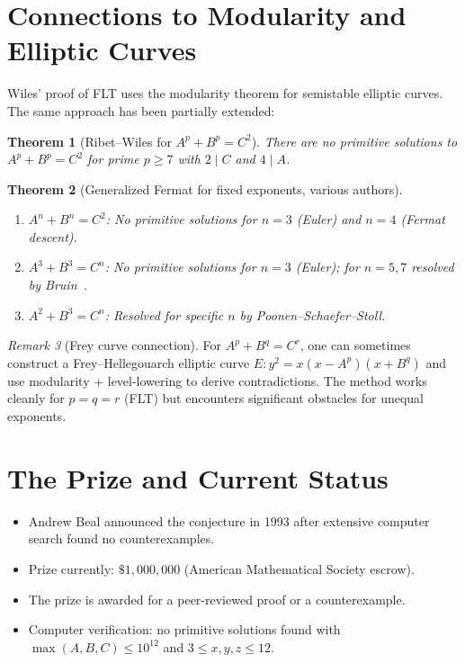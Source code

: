 \documentclass[12pt,a4paper]{amsart}
\newtheorem{theorem}{Theorem}[section]
\theoremstyle{definition}
\theoremstyle{remark}
\newtheorem{remark}[theorem]{Remark}
\begin{document}
\section{Connections to Modularity and Elliptic Curves}

Wiles' proof of FLT uses the modularity theorem for semistable elliptic curves.
The same approach has been partially extended:

\begin{theorem}[Ribet--Wiles for $A^p + B^p = C^2$]\label{thm:rpw}
There are no primitive solutions to $A^p + B^p = C^2$ for prime $p \geq 7$
with $2 \mid C$ and $4 \mid A$.
\end{theorem}

\begin{theorem}[Generalized Fermat for fixed exponents, various authors]\label{thm:genFerm}
\begin{enumerate}[label=(\roman*)]
  \item $A^n + B^n = C^2$: No primitive solutions for $n = 3$ (Euler) and
        $n = 4$ (Fermat descent).
  \item $A^3 + B^3 = C^n$: No primitive solutions for $n = 3$ (Euler); for
        $n = 5, 7$ resolved by Bruin~\cite{Bruin03}.
  \item $A^2 + B^3 = C^n$: Resolved for specific $n$ by Poonen--Schaefer--Stoll.
\end{enumerate}
\end{theorem}

\begin{remark}[Frey curve connection]
For $A^p + B^q = C^r$, one can sometimes construct a Frey--Hellegouarch elliptic
curve $E: y^2 = x(x - A^p)(x + B^q)$ and use modularity + level-lowering to derive
contradictions. The method works cleanly for $p = q = r$ (FLT) but encounters
significant obstacles for unequal exponents.
\end{remark}

\section{The Prize and Current Status}

\begin{itemize}
  \item Andrew Beal announced the conjecture in 1993 after extensive computer
        search found no counterexamples.
  \item Prize currently: $\$1{,}000{,}000$ (American Mathematical Society escrow).
  \item The prize is awarded for a peer-reviewed proof or a counterexample.
  \item Computer verification: no primitive solutions found with
        $\max(A,B,C) \leq 10^{12}$ and $3 \leq x,y,z \leq 12$.
\end{itemize}
\end{document}
